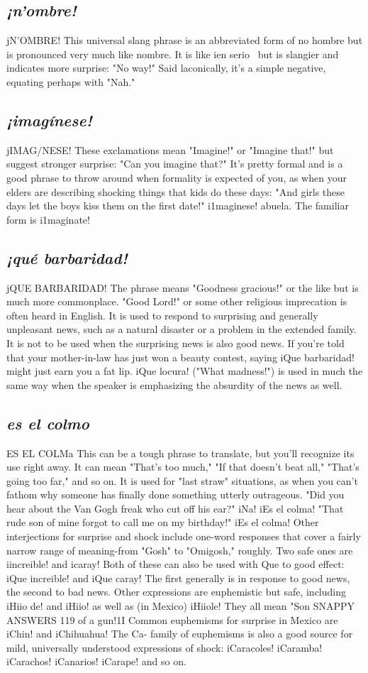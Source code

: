 \subsection{\emph{¡n'ombre!}}
jN'OMBRE!
This universal slang phrase is an abbreviated form of no hombre but is pronounced very much like nombre. It is like ien serio~ but
is slangier and indicates more surprise: "No way!" Said laconically, it's
a simple negative, equating perhaps with "Nah."
\subsection{\emph{¡imagínese!}}
jIMAG/NESE!
These exclamations mean "Imagine!" or "Imagine that!" but
suggest stronger surprise: "Can you imagine that?" It's pretty formal
and is a good phrase to throw around when formality is expected of
you, as when your elders are describing shocking things that kids do
these days: "And girls these days let the boys kiss them on the first
date!" i1maginese! abuela. The familiar form is i1maginate!
\subsection{\emph{¡qué barbaridad!}}
jQUE BARBARIDAD!
The phrase means "Goodness gracious!" or the like but is
much more commonplace. "Good Lord!" or some other religious imprecation is often heard in English. It is used to respond to surprising
and generally unpleasant news, such as a natural disaster or a problem
in the extended family. It is not to be used when the surprising news is
also good news. If you're told that your mother-in-law has just won a
beauty contest, saying iQue barbaridad! might just earn you a fat lip.
iQue locura! ("What madness!") is used in much the same way when
the speaker is emphasizing the absurdity of the news as well.
\subsection{\emph{es el colmo}}
ES EL COLMa
This can be a tough phrase to translate, but you'll recognize
its use right away. It can mean "That's too much," "If that doesn't beat
all," "That's going too far," and so on. It is used for "last straw" situations, as when you can't fathom why someone has finally done something utterly outrageous. "Did you hear about the Van Gogh freak who
cut off his ear?" iNa! iEs el colma! "That rude son of mine forgot to
call me on my birthday!" iEs el colma!
Other interjections for surprise and shock include one-word
responses that cover a fairly narrow range of meaning-from "Gosh"
to "Omigosh," roughly. Two safe ones are iincreible! and icaray! Both
of these can also be used with Que to good effect: iQue increible! and
iQue caray! The first generally is in response to good news, the second
to bad news. Other expressions are euphemistic but safe, including
iHiio de! and iHiio! as well as (in Mexico) iHiiole! They all mean "Son
SNAPPY ANSWERS 119
of a gun!1I Common euphemisms for surprise in Mexico are iChin! and
iChihuahua! The Ca- family of euphemisms is also a good source for
mild, universally understood expressions of shock: iCaracoles! iCaramba! iCarachos! iCanarios! iCarape! and so on.

